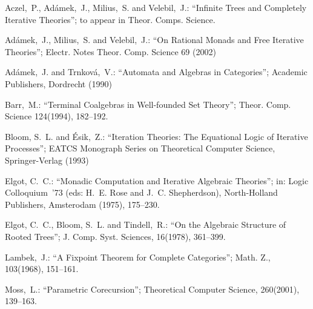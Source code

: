 \documentclass{entcs}
\begin{document}
\begin{thebibliography}{}
Aczel,~P., Ad\'amek,~J., Milius,~S. and Ve\-le\-bil,~J.: ``Infinite Trees and
Completely Iterative Theories''; to appear in Theor. Comps. Science.


Ad\'amek,~J., Milius,~S. and Velebil,~J.: ``On Rational Monads and Free Iterative Theories''; Electr. Notes Theor. Comp. Science 69 (2002)

Ad\'amek,~J. and Trnkov\'a,~V.: ``Automata and Algebras in
Categories''; Academic Publishers, Dordrecht (1990)

Barr,~M.: ``Terminal Coalgebras in Well-founded Set Theory''; Theor.
Comp. Science 124(1994), \mbox{182--192}.

Bloom, S.~L. and \'Esik,~Z.: ``Iteration Theories: The Equational
Logic of Iterative Processes''; EATCS Monograph Series on
Theoretical Computer Science, Springer-Verlag (1993)

Elgot, C.~C.: ``Monadic Computation and Iterative Algebraic
Theories''; in: Logic Colloquium~'73 (eds: H.~E. Rose and J.~C.
Shepherdson), North-Holland Publishers, Amsterodam (1975),
\mbox{175--230}.

Elgot, C.~C., Bloom, S.~L. and Tindell,~R.: ``On the Algebraic
Structure of Rooted Trees''; J. Comp. Syst. Sciences, 16(1978),
\mbox{361--399}.

Lambek,~J.: ``A Fixpoint Theorem for Complete Categories''; Math.
Z., 103(1968), \mbox{151--161}.

Moss,~L.: ``Parametric Corecursion''; Theoretical Computer Science,
260(2001), \mbox{139--163}.

\end{thebibliography}
\end{document}
